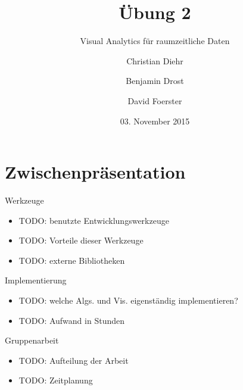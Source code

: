 \documentclass{beamer}
\title{Übung 2}
\subtitle{Visual Analytics für raumzeitliche Daten}
\author{Christian Diehr \and Benjamin Drost \and David Foerster}
\institute{Institut für Informatik\\Humboldt-Universität zu Berlin}
\date{03. November 2015}
\begin{document}
    \begin{frame}
        \titlepage
    \end{frame}
    \logo{} %
    
    \section{Zwischenpräsentation}
    \begin{frame}{Werkzeuge}
        \begin{itemize}
	        \setlength\itemsep{1em}
        	\item TODO: benutzte Entwicklungswerkzeuge
        	\item TODO: Vorteile dieser Werkzeuge
        	\item TODO: externe Bibliotheken
        \end{itemize}
    \end{frame}
    
    \begin{frame}{Implementierung}
    	\begin{itemize}
	        \setlength\itemsep{1em}
    		\item TODO: welche Algs. und Vis. eigenständig implementieren?
    		\item TODO: Aufwand in Stunden
    	\end{itemize}
    \end{frame}
    
    \begin{frame}{Gruppenarbeit}
    	\begin{itemize}
    		\setlength\itemsep{1em}
    		\item TODO: Aufteilung der Arbeit
    		\item TODO: Zeitplanung
    	\end{itemize}
    \end{frame}
    
\end{document}
